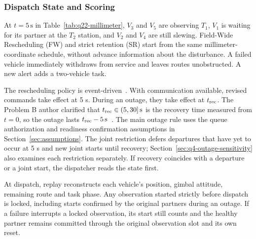\documentclass{swmcmthesis}
\begin{document}
\subsubsection{Dispatch State and Scoring}

At \(t=5\,\mathrm s\) in Table~\ref{tab:q22-millimeter}, \(V_3\) and \(V_5\) are observing \(T_1\), \(V_1\) is waiting for its partner at the \(T_2\) station, and \(V_2\) and \(V_4\) are still slewing. Field-Wide Rescheduling (FW) and strict retention (SR) start from the same millimeter-coordinate schedule, without advance information about the disturbance. A failed vehicle immediately withdraws from service and leaves routes unobstructed. A new alert adds a two-vehicle task.

The rescheduling policy is event-driven~\cite{ref:rescheduling}. With communication available, revised commands take effect at 5 s. During an outage, they take effect at \(t_{\rm rec}\). The Problem B author clarified that \(t_{\rm rec}\in(5,30]\,\mathrm s\) is the recovery time measured from \(t=0\), so the outage lasts \(t_{\rm rec}-5\,\mathrm s\)~\cite{ref:problem-b-outage}. The main outage rule uses the queue authorization and readiness confirmation assumptions in Section~\ref{sec:assumptions}. The joint restriction defers departures that have yet to occur at 5 s and new joint starts until recovery; Section~\ref{sec:q4-outage-sensitivity} also examines each restriction separately. If recovery coincides with a departure or a joint start, the dispatcher reads the state first.

At dispatch, replay reconstructs each vehicle's position, gimbal attitude, remaining route and task phase. Any observation started strictly before dispatch is locked, including starts confirmed by the original partners during an outage. If a failure interrupts a locked observation, its start still counts and the healthy partner remains committed through the original observation slot and its own reset.
\end{document}
